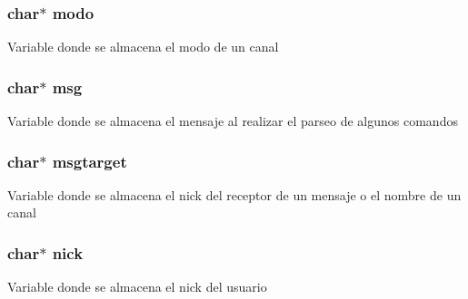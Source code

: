 \subsubsection[{\texorpdfstring{modo}{modo}}]{\setlength{\rightskip}{0pt plus 5cm}char$\ast$ modo}\hypertarget{_g-2361-06-_p1-_server_8c_a7451f0d59207b53af6178219fcf62677}{}\label{_g-2361-06-_p1-_server_8c_a7451f0d59207b53af6178219fcf62677}
Variable donde se almacena el modo de un canal 
\subsubsection[{\texorpdfstring{msg}{msg}}]{\setlength{\rightskip}{0pt plus 5cm}char$\ast$ msg}\hypertarget{_g-2361-06-_p1-_server_8c_a32d2f5216cddb59c7cc8fb2806a7e727}{}\label{_g-2361-06-_p1-_server_8c_a32d2f5216cddb59c7cc8fb2806a7e727}
Variable donde se almacena el mensaje al realizar el parseo de algunos comandos 
\subsubsection[{\texorpdfstring{msgtarget}{msgtarget}}]{\setlength{\rightskip}{0pt plus 5cm}char$\ast$ msgtarget}\hypertarget{_g-2361-06-_p1-_server_8c_a968dcc7e43caeca7959f3c069dcccc6a}{}\label{_g-2361-06-_p1-_server_8c_a968dcc7e43caeca7959f3c069dcccc6a}
Variable donde se almacena el nick del receptor de un mensaje o el nombre de un canal 
\subsubsection[{\texorpdfstring{nick}{nick}}]{\setlength{\rightskip}{0pt plus 5cm}char$\ast$ nick}\hypertarget{_g-2361-06-_p1-_server_8c_a89f27568c92a418413e6b37b41f07e21}{}\label{_g-2361-06-_p1-_server_8c_a89f27568c92a418413e6b37b41f07e21}
Variable donde se almacena el nick del usuario 
